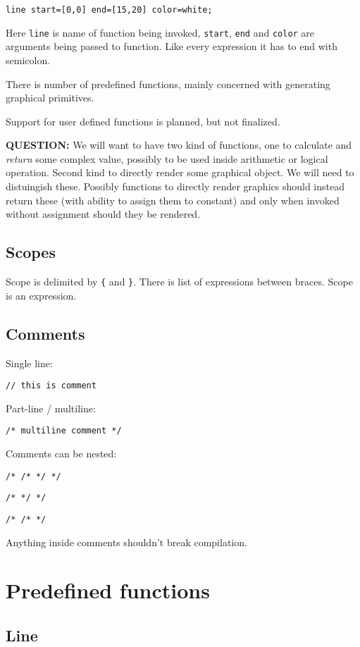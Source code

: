 \documentclass{scrreprt}
\newcommand{\question}[1]{
    \color{red} \textbf{QUESTION:} \color{black} #1
}
\begin{document}
\texttt{line start=[0,0] end=[15,20] color=white;}

Here \texttt{line} is name of function being invoked, \texttt{start}, \texttt{end} and \texttt{color} are arguments being passed to function. Like every expression it has to end with semicolon.

There is number of predefined functions, mainly concerned with generating graphical primitives.

Support for user defined functions is planned, but not finalized.

\question{We will want to have two kind of functions, one to calculate and \textit{return} some complex value, possibly to be used inside arithmetic or logical operation. Second kind to directly render some graphical object. We will need to distuingish these. Possibly functions to directly render graphics should instead return these (with ability to assign them to constant) and only when invoked without assignment should they be rendered.}

\section{Scopes}

Scope is delimited by \texttt{\{} and \texttt{\}}. There is list of expressions between braces. Scope is an expression.


\section{Comments}

Single line:

\texttt{// this is comment}

Part-line / multiline:

\texttt{/* multiline comment */}

Comments can be nested:

\texttt{/* /* */ */}

\texttt{/* */ */}

\texttt{/* /* */}

Anything inside comments shouldn't break compilation.


\chapter{Predefined functions}

\section{Line}
\end{document}
